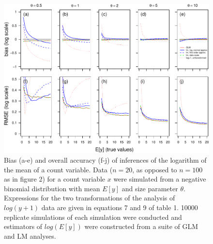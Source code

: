 \documentclass[]{article}
\begin{document}
\begin{figure}[h]

{\centering \includegraphics{revisiting_count_data_advice_files/figure-latex/biasAndRmseFigureLogSmallN-1} 

}

\caption{Bias (a-e) and overall accuracy (f-j) of inferences of the logarithm of the mean of a count variable.  Data ($n=20$, as opposed to $n=100$ as in figure 2) for a count variable $x$ were simulated from a negative binomial distribution with mean $E[y]$ and size parameter $\theta$.  Expressions for the two transformations of the analysis of $log(y+1)$ data are given in equations 7 and 9 of table 1. 10000 replicate simulations of each simulation were conducted and estimators of $log(E[y])$ were constructed from a suite of GLM and LM analyses.}\label{fig:biasAndRmseFigureLogSmallN}
\end{figure}
\end{document}
